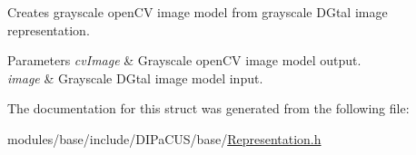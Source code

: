 Creates grayscale open\+CV image model from grayscale D\+Gtal image representation. 


\begin{DoxyParams}{Parameters}
{\em cv\+Image} & Grayscale open\+CV image model output. \\
\hline
{\em image} & Grayscale D\+Gtal image model input. \\
\hline
\end{DoxyParams}


The documentation for this struct was generated from the following file\+:\begin{DoxyCompactItemize}
\item 
modules/base/include/\+D\+I\+Pa\+C\+U\+S/base/\mbox{\hyperlink{Representation_8h}{Representation.\+h}}\end{DoxyCompactItemize}
